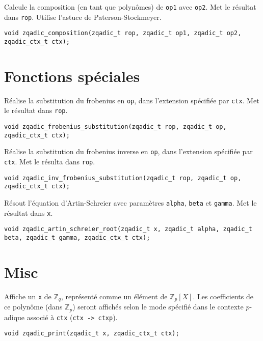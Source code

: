 \documentclass[11pt]{article}
\begin{document}
Calcule la composition (en tant que polynômes) de \texttt{op1} avec \texttt{op2}. Met le résultat dans \texttt{rop}. Utilise l'astuce de Paterson-Stockmeyer. 
\begin{verbatim}
void zqadic_composition(zqadic_t rop, zqadic_t op1, zqadic_t op2, zqadic_ctx_t ctx);
\end{verbatim}


\section{Fonctions spéciales}

Réalise la substitution du frobenius en \texttt{op}, dans l'extension spécifiée par \texttt{ctx}. Met le résultat dans \texttt{rop}. 
\begin{verbatim}
void zqadic_frobenius_substitution(zqadic_t rop, zqadic_t op, zqadic_ctx_t ctx);
\end{verbatim}

Réalise la substitution du frobenius inverse en \texttt{op}, dans l'extension spécifiée par \texttt{ctx}. Met le résulta dans \texttt{rop}. 
\begin{verbatim}
void zqadic_inv_frobenius_substitution(zqadic_t rop, zqadic_t op, zqadic_ctx_t ctx);
\end{verbatim}

Résout l'équation d'Artin-Schreier avec paramètres \texttt{alpha}, \texttt{beta} et \texttt{gamma}. Met le résultat dans \texttt{x}. 
\begin{verbatim}
void zqadic_artin_schreier_root(zqadic_t x, zqadic_t alpha, zqadic_t beta, zqadic_t gamma, zqadic_ctx_t ctx);
\end{verbatim}


\section{Misc}

Affiche un \texttt{x} de $\mathbb{Z}_q$, représenté comme un élément de $\mathbb{Z}_p[X]$. Les coefficients de ce polynôme (dans $\mathbb{Z}_p$) seront affichés selon le mode spécifié dans le contexte $p$-adique associé à \texttt{ctx} (\texttt{ctx -> ctxp}). 
\begin{verbatim}
void zqadic_print(zqadic_t x, zqadic_ctx_t ctx);
\end{verbatim}


%  
% 
\end{document}
